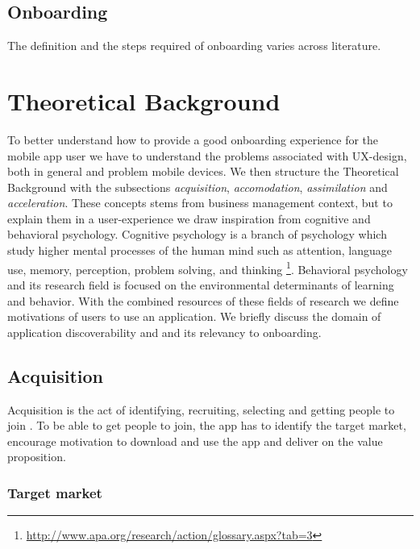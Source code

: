 \subsection{Onboarding}
The definition and the steps required of onboarding varies across literature.

\section{Theoretical Background}
To better understand how to provide a good onboarding experience for the mobile app user we have to understand the problems associated with UX-design, both in general and problem mobile devices. We then structure the Theoretical Background with the subsections \textit{acquisition}, \textit{accomodation}, \textit{assimilation} and \textit{acceleration}. These concepts stems from business management context, but to explain them in a user-experience we draw inspiration from cognitive and behavioral psychology. Cognitive psychology is a branch of psychology which study higher mental processes of the human mind such as attention, language use, memory, perception, problem solving, and thinking \footnote{\url{http://www.apa.org/research/action/glossary.aspx?tab=3}}. Behavioral psychology and its research field is focused on the environmental determinants of learning and behavior. With the combined resources of these fields of research we define motivations of users to use an application. We briefly discuss the domain of application discoverability and and its relevancy to onboarding.

\subsection{Acquisition}
Acquisition is the act of identifying, recruiting, selecting and getting people to join \cite{Bradt2009}. To be able to get people to join, the app has to identify the target market, encourage motivation to download and use the app and deliver on the value proposition.

\subsubsection{Target market}

